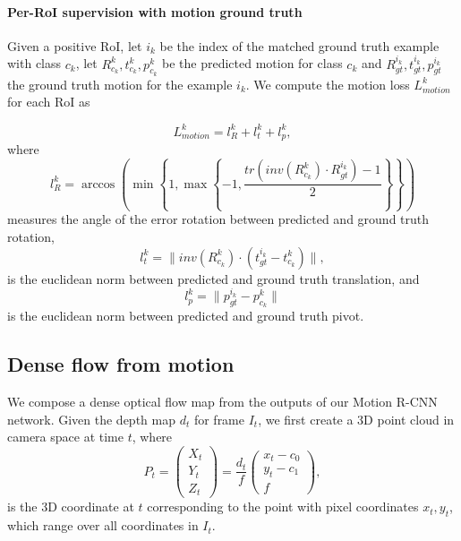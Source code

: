 \paragraph{Per-RoI supervision with motion ground truth}
Given a positive RoI, let $i_k$ be the index of the matched ground truth example with class $c_k$,
let $R_{c_k}^k, t_{c_k}^k, p_{c_k}^k$ be the predicted motion for class $c_k$
and $R_{gt}^{i_k}, t_{gt}^{i_k}, p_{gt}^{i_k}$ the ground truth motion for the example $i_k$.
We compute the motion loss $L_{motion}^k$ for each RoI as

\begin{equation}
L_{motion}^k =l_{R}^k + l_{t}^k + l_{p}^k,
\end{equation}
where
\begin{equation}
l_{R}^k = \arccos\left( \min\left\{1, \max\left\{-1, \frac{tr(inv(R_{c_k}^k) \cdot R_{gt}^{i_k}) - 1}{2} \right\}\right\} \right)
\end{equation}
measures the angle of the error rotation between predicted and ground truth rotation,
\begin{equation}
l_{t}^k = \lVert inv(R_{c_k}^k) \cdot (t_{gt}^{i_k} - t_{c_k}^k) \rVert,
\end{equation}
is the euclidean norm between predicted and ground truth translation, and
\begin{equation}
l_{p}^k = \lVert p_{gt}^{i_k} - p_{c_k}^k \rVert
\end{equation}
is the euclidean norm between predicted and ground truth pivot.


\subsection{Dense flow from motion}
We compose a dense optical flow map from the outputs of our Motion R-CNN network.
Given the depth map $d_t$ for frame $I_t$, we first create a 3D point cloud in camera space at time $t$,
where
\begin{equation}
P_t =
\begin{pmatrix}
X_t \\ Y_t \\ Z_t
\end{pmatrix}
=
\frac{d_t}{f}
\begin{pmatrix}
x_t - c_0 \\ y_t - c_1 \\ f
\end{pmatrix},
\end{equation}
is the 3D coordinate at $t$ corresponding to the point with pixel coordinates $x_t, y_t$,
which range over all coordinates in $I_t$.

